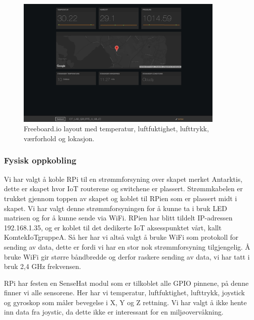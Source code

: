\documentclass{article}
\begin{document}
\begin{figure}
  \centering
      \includegraphics[width=0.9\textwidth]{freeboard}
  \caption{Freeboard.io layout med temperatur, luftfuktighet, lufttrykk, værforhold og lokasjon.}
\end{figure}

\subsubsection{Fysisk oppkobling}
Vi har valgt å koble RPi til en strømmforsyning over skapet merket Antarktis, dette er skapet hvor IoT routerene og switchene er plassert. Strømmkabelen er trukket gjennom toppen av skapet og koblet til RPien som er plassert midt i skapet. Vi har valgt denne strømmforsyningen for å kunne ta i bruk LED matrisen og for å kunne sende via WiFi. RPien har blitt tildelt IP-adressen 192.168.1.35, og er koblet til det dedikerte IoT aksesspunktet vårt, kallt KomtekIoTgruppeA. Så her har vi altså valgt å bruke WiFi som protokoll for sending av data, dette er fordi vi har en stor nok strømmforsyning tilgjengelig. Å bruke WiFi gir større båndbredde og derfor raskere sending av data, vi har tatt i bruk 2,4 GHz frekvensen.

RPi har festen en SenseHat modul som er tilkoblet alle GPIO pinnene, på denne finner vi alle sensorene. Her har vi temperatur, luftfuktighet, lufttrykk, joystick og gyroskop som måler bevegelse i X, Y og Z rettning. Vi har valgt å ikke hente inn data fra joystic, da dette ikke er interessant for en miljøovervåkning.
\end{document}
